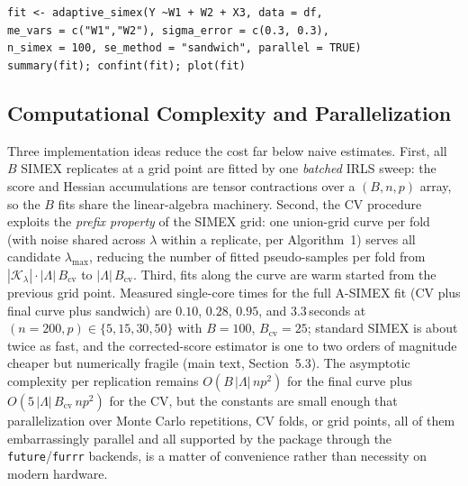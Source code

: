 \documentclass[11pt]{article}
\theoremstyle{plain}
\theoremstyle{definition}
\begin{document}
\begin{center}
\small
\begin{minipage}{0.93\textwidth}
\texttt{fit <- adaptive\_simex(Y \textasciitilde W1 + W2 + X3, data = df,\\
\quad me\_vars = c("W1","W2"), sigma\_error = c(0.3, 0.3),\\
\quad n\_simex = 100, se\_method = "sandwich", parallel = TRUE)}\\
\texttt{summary(fit); confint(fit); plot(fit)}
\end{minipage}
\end{center}

\subsection*{Computational Complexity and Parallelization}\label{sec:complexity}


Three implementation ideas reduce the cost far below naive estimates.
First, all $B$ SIMEX replicates at a grid point are fitted by one
\emph{batched} IRLS sweep: the score and Hessian accumulations are
tensor contractions over a $(B,n,p)$ array, so the $B$ fits share the
linear-algebra machinery. Second, the CV procedure exploits the
\emph{prefix property} of the SIMEX grid: one union-grid curve per
fold (with noise shared across $\lambda$ within a replicate, per
Algorithm~1) serves all candidate $\lambda_{\max}$, reducing the
number of fitted pseudo-samples per fold from
$|\mathcal K_\lambda|\cdot|\Lambda|\,B_{\mathrm{cv}}$ to
$|\Lambda|\,B_{\mathrm{cv}}$. Third, fits along the curve are warm
started from the previous grid point. Measured single-core times for
the full A-SIMEX fit (CV plus final curve plus sandwich) are $0.10$,
$0.28$, $0.95$, and $3.3$\,seconds at $(n{=}200,p)\in
\{5,15,30,50\}$ with $B=100$, $B_{\mathrm{cv}}=25$; standard SIMEX is
about twice as fast, and the corrected-score estimator is one to two
orders of magnitude cheaper but numerically fragile
(main text, Section~5.3). The asymptotic complexity per replication
remains $O(B\,|\Lambda|\,n p^2)$ for the final curve plus
$O(5\,|\Lambda|\,B_{\mathrm{cv}}\,n p^2)$ for the CV, but the
constants are small enough that parallelization over Monte Carlo
repetitions, CV folds, or grid points, all of them embarrassingly
parallel and all supported by the package through the
\texttt{future}/\texttt{furrr} backends, is a matter of convenience
rather than necessity on modern hardware.

\end{document}
